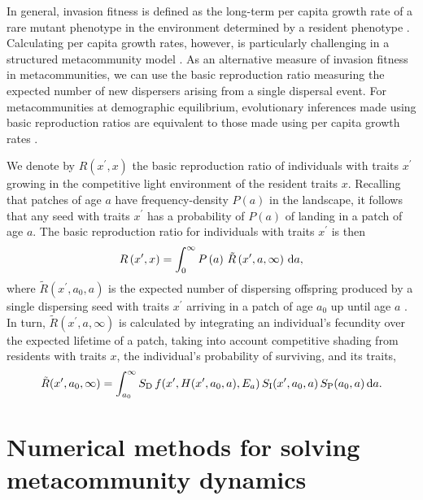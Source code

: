 \documentclass[10pt,twoside]{article}
\begin{document}
In general, invasion fitness is defined as the long-term per capita
growth rate of a rare mutant phenotype in the environment
determined by a resident phenotype \citep{Metz-1992}. Calculating
per capita growth rates, however, is particularly challenging in a
structured metacommunity model \citep{Gyllenberg-2001, Metz-2001}. As
an alternative measure of invasion fitness in metacommunities, we can use the basic reproduction
ratio measuring the expected number of new dispersers arising from a
single dispersal event. For metacommunities at demographic equilibrium, evolutionary inferences made using basic
reproduction ratios are equivalent to those made using per capita growth
rates
\citep{Gyllenberg-2001, Metz-2001}.

We denote by \(R\left(x^\prime, x\right)\) the basic reproduction ratio of
individuals with traits \(x^\prime\) growing in the competitive
light environment of the resident traits \(x\). Recalling that patches of age
\(a\) have frequency-density \(P(a)\) in the landscape, it follows that any seed
with traits \(x^\prime\) has a probability of \(P(a)\) of landing in a patch of age
\(a\). The basic reproduction ratio for individuals with traits
\(x^\prime\) is then
\begin{equation} \label{eq:InvFit}
R\left(x^\prime,x\right) = \int _0^{\infty} P\left(a\right) \, \tilde{R}\left(x^\prime, a, \infty \right) \, {\rm d}a ,
\end{equation}
where \(\tilde{R}\left(x^\prime, a_0, a \right)\) is the expected number
of dispersing offspring produced by a single dispersing seed with traits \(x^\prime\) arriving in
a patch of age \(a_0\) up until age \(a\)
\citep{Gyllenberg-2001, Metz-2001}.
In turn, \(\tilde{R}\left(x^\prime, a,\infty\right)\) is calculated by integrating
an individual's fecundity over the expected lifetime of a patch, taking
into account competitive shading from residents with traits \(x\), the
individual's probability of surviving, and its traits,
\begin{equation} \label{eq:tildeR}
\tilde{R}(x^\prime, a_0, \infty) = \int_{a_0}^{\infty} S_{\rm D} \, f(x^\prime, H(x^\prime, a_0, a), E_{a}) \, S_{\rm I} (x^\prime, a_0, a) \, S_{\rm P} (a_0, a) \, {\rm d} a.
\end{equation}

\section{Numerical methods for solving metacommunity dynamics}
\end{document}
